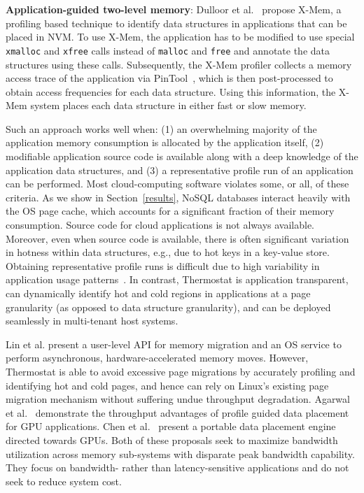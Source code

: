 \label{related}

\textbf{Application-guided two-level memory}: Dulloor et al.~\cite{ref:Dulloor:datatiering} propose X-Mem, a profiling based
technique to identify data structures in applications that can be placed in
NVM. To use X-Mem, the application has to be modified to use special {\tt
xmalloc} and {\tt xfree} calls instead of {\tt malloc} and {\tt free} and
annotate the data structures using these calls. Subsequently, the X-Mem profiler
collects a memory access trace of the application via PinTool~\cite{ref:pin},
which is then post-processed to obtain access frequencies for each data
structure. Using this information, the X-Mem system places each data structure
in either fast or slow memory.

Such an approach works well when: (1) an overwhelming majority of the application
memory consumption is allocated by the application itself, (2) modifiable
application source code is available along with a deep knowledge of the
application data structures, and (3) a representative profile run of an
application can be performed.
Most cloud-computing software violates some, or all, of these criteria. As we
show in Section~\ref{results}, NoSQL databases interact heavily with the OS page cache, 
which accounts for a significant fraction of their memory consumption. Source code for cloud
applications is not always available.
Moreover, even when source code is available, there is
often significant variation in hotness within data structures, e.g., due to hot
keys in a key-value store.
Obtaining representative profile runs is difficult due to high variability in
application usage patterns~\cite{facebook-key-value}. 
In contrast, Thermostat is application transparent, can dynamically 
identify hot and cold regions in applications at a page granularity (as opposed 
to data structure granularity),
and can be deployed seamlessly in multi-tenant host systems.

Lin et al. present a user-level API for memory migration and an OS service to perform
asynchronous, hardware-accelerated memory moves\cite{ref:memif:Lin:2016}.
However, Thermostat is able to avoid excessive page migrations by
accurately profiling and identifying hot and cold pages, and hence can rely on 
Linux's existing page migration mechanism without suffering undue throughput
degradation.  Agarwal et
al.~\cite{ref:agarwal:asplos2015, ref:agarwal:hpca2015} demonstrate the throughput advantages of profile
guided data placement for GPU applications. Chen et al.~\cite{ref:chen:porple}
present a portable data placement engine directed towards GPUs. Both of these
proposals seek to maximize bandwidth utilization across memory sub-systems
with disparate peak bandwidth capability.  They focus on bandwidth- rather than
latency-sensitive applications and do not seek to reduce system cost.

